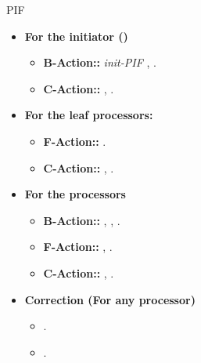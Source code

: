 \documentclass{llncs}
\begin{document}
\begin{algorithm}[htb]
\caption{PIF \label{algo:PIF}}
\begin{scriptsize}

   \begin{itemize}
       \item{\textbf{For the initiator ()}}\begin{itemize}
                \item{\textbf{B-Action::}} \textit{init-PIF } , .
                 \item{\textbf{C-Action::}}    ,   .\\
                 \end{itemize}
        \item{\textbf{For the leaf processors:   }} \begin{itemize}
                  \item{\textbf{F-Action::}}     .
                  \item{\textbf{C-Action::}}   ,    . \\
                   \end{itemize}
          \item {\textbf{For the processors}}\begin{itemize}
                    \item{\textbf{B-Action::}}  ,       ,   . 
                    \item{\textbf{F-Action::}}     ,   . 
                    \item{\textbf{C-Action::}}    ,    . \\
                      \end{itemize}
            \item {\textbf{Correction (For any processor)}} \begin{itemize}
                        \item {     .}
                        \item{    .}
                        \end{itemize}
   \end{itemize}
   \end{scriptsize}
\end{algorithm}
\end{document}
